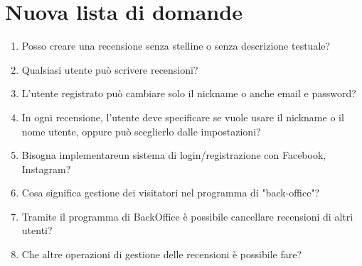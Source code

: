 \documentclass{article}
\begin{document}
\section{Nuova lista di domande}
\begin{enumerate}
    \item Posso creare una recensione senza stelline o senza descrizione testuale?
    \item Qualsiasi utente può scrivere recensioni? 
    \item L'utente registrato può cambiare solo il nickname o anche email e password?
    \item In ogni recensione, l'utente deve specificare se vuole usare il nickname o il nome utente, oppure può sceglierlo dalle impostazioni?
    \item Bisogna implementareun sistema di login/registrazione con Facebook, Instagram?
    \item Cosa significa gestione dei visitatori nel programma di "back-office"?
    \item Tramite il programma di BackOffice è possibile cancellare recensioni di altri utenti?
    \item Che altre operazioni di gestione delle recensioni è possibile fare?
\end{enumerate}    
 
\end{document}
